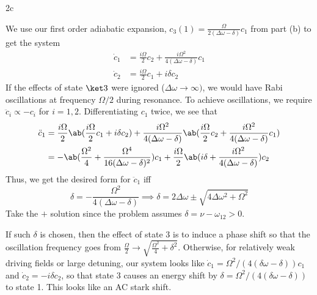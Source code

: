 \documentclass[12pt]{article}
\begin{document}
\begin{exc}{2c}

\end{exc}
\begin{ans}
    We use our first order adiabatic expansion, $c_3{(1)} = \frac{\Omega}{2(\Delta \omega - \delta)}c_1$ from part (b) to get the system 
    \begin{align*}
        \dot c_1 &= \frac{i\Omega}2 c_2 + \frac{i\Omega^2}{4(\Delta \omega - \delta)}c_1 \\ 
       \dot c_2 &= \frac{i\Omega}2c_1 + i\delta c_2
    \end{align*}
    If the effects of state $\ket 3$ were ignored ($\Delta \omega \to \infty)$, we would have Rabi oscillations at frequency $\Omega/2$ during resonance. To achieve oscillations, we require $\ddot c_i \propto - c_i$ for $i = 1,2$. Differentiating $c_1$ twice, we see that
    \begin{align*}
        \ddot c_1 &= \frac{i\Omega}2\ab(\frac{i\Omega}2c_1 + i\delta c_2)  + \frac{i\Omega^2}{4(\Delta \omega - \delta)} \ab(\frac{i\Omega}2  c_2 + \frac{i\Omega^2}{4(\Delta \omega - \delta)}c_1)\\
        &= -\ab(\frac{\Omega^2}4 + \frac{\Omega^4}{16(\Delta \omega - \delta)^2}) c_1 + \frac{i\Omega}{2}\ab(i\delta + \frac{i\Omega^2}{4(\Delta \omega - \delta)})c_2
    \end{align*}
    Thus, we get the desired form for $\ddot c_1$ iff 
    \[\delta = -\frac{\Omega^2}{4(\Delta \omega - \delta)} \implies \delta = 2\Delta \omega \pm \sqrt{4\Delta\omega^2 + \Omega^2}\] 
    Take the $+$ solution since the problem assumes $\delta  = \nu - \omega_{12} > 0$.


    If such $\delta$ is chosen, then the effect of state 3 is to induce a phase shift so that the oscillation frequency goes from $\frac \Omega 2 \to \sqrt{\frac{\Omega^2}4 + \delta^2}$. Otherwise, for relatively weak driving fields or large detuning, our system looks like $\dot c_1 = \Omega^2/(4(\delta \omega - \delta)) c_1$ and $\dot c_2 = -i\delta c_2$, so that state 3 causes an energy shift by $\delta = \Omega^2/(4(\delta \omega - \delta))$ to state 1. This looks like an AC stark shift.
\end{ans}
\end{document}
